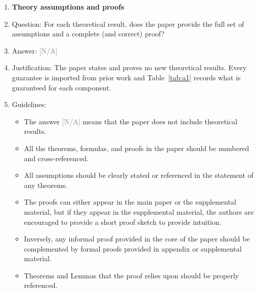 \documentclass{article}
\providecommand{\answerNA}[1][]{\textcolor{gray}{[N/A] #1}}
\begin{document}
\begin{enumerate}
\begin{itemize}
        \item If applicable, the authors should discuss possible limitations of their approach to address problems of privacy and fairness.
        \item While the authors might fear that complete honesty about limitations might be used by reviewers as grounds for rejection, a worse outcome might be that reviewers discover limitations that aren't acknowledged in the paper. The authors should use their best judgment and recognize that individual actions in favor of transparency play an important role in developing norms that preserve the integrity of the community. Reviewers will be specifically instructed to not penalize honesty concerning limitations.
    \end{itemize}

\item {\bf Theory assumptions and proofs}
    \item[] Question: For each theoretical result, does the paper provide the full set of assumptions and a complete (and correct) proof?
    \item[] Answer: \answerNA{}
    \item[] Justification: The paper states and proves no new theoretical results. Every guarantee is imported from prior work and Table~\ref{tab:a1} records what is guaranteed for each component.
    \item[] Guidelines:
    \begin{itemize}
        \item The answer \answerNA{} means that the paper does not include theoretical results.
        \item All the theorems, formulas, and proofs in the paper should be numbered and cross-referenced.
        \item All assumptions should be clearly stated or referenced in the statement of any theorems.
        \item The proofs can either appear in the main paper or the supplemental material, but if they appear in the supplemental material, the authors are encouraged to provide a short proof sketch to provide intuition.
        \item Inversely, any informal proof provided in the core of the paper should be complemented by formal proofs provided in appendix or supplemental material.
        \item Theorems and Lemmas that the proof relies upon should be properly referenced.
    \end{itemize}


\end{enumerate}
\end{document}
